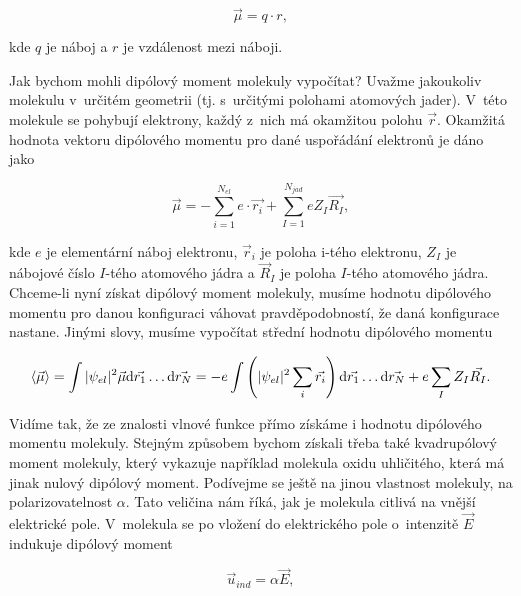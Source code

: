 \begin{equation}
\vec{\mu} = q \cdot r,
\label{rov:Vl-3}
\end{equation}

\noindent kde $q$ je náboj a $r$ je vzdálenost mezi náboji. 

Jak bychom mohli dipólový moment molekuly vypočítat? Uvažme jakoukoliv molekulu v~určitém geometrii (tj. s~určitými polohami atomových jader). V~této molekule se pohybují elektrony, každý z~nich má okamžitou polohu $\vec{r}$. Okamžitá hodnota vektoru dipólového momentu pro dané uspořádání elektronů je dáno jako

\begin{equation}
\vec{\mu} = - \sum_{i=1}^{N_{el}} e \cdot \vec{r_i} + \sum_{I=1}^{N_{jad}} e Z_I \vec{R_I},
\label{rov:Vl-4}
\end{equation}

\noindent kde $e$ je elementární náboj elektronu, $\vec{r}_i$ je poloha i-tého elektronu, $Z_I$ je nábojové číslo $I$-tého atomového jádra a $\vec{R}_I$ je poloha $I$-tého atomového jádra. Chceme-li nyní získat dipólový moment molekuly, musíme hodnotu dipólového momentu pro danou konfiguraci váhovat pravděpodobností, že daná konfigurace nastane. Jinými slovy, musíme vypočítat střední hodnotu dipólového momentu

\begin{equation}
\braket{\vec{\mu}} = \int \vert \psi_{el} \vert^2 \vec{\mu} \mathrm{d} \vec{r_1} \dots \mathrm{d} \vec{r_N} = - e \int \left( \vert \psi_{el} \vert^2 \sum_{i} \vec{r_i} \right) \mathrm{d} \vec{r_1} \dots \mathrm{d} \vec{r_N} + e \sum_{I} Z_I \vec{R_I}.
\label{rov:Vl-5}
\end{equation}

Vidíme tak, že ze znalosti vlnové funkce přímo získáme i hodnotu dipólového momentu molekuly. Stejným způsobem bychom získali třeba také kvadrupólový moment molekuly, který vykazuje například molekula oxidu uhličitého, která má jinak nulový dipólový moment. Podívejme se ještě na jinou vlastnost molekuly, na polarizovatelnost $\alpha$. Tato veličina nám říká, jak je molekula citlivá na vnější elektrické pole. V~molekula se po vložení do elektrického pole o~intenzitě $\vec{E}$ indukuje dipólový moment

\begin{equation}
\vec{u}_{ind} = \alpha \vec{E},
\label{rov:Vl-6}
\end{equation}

